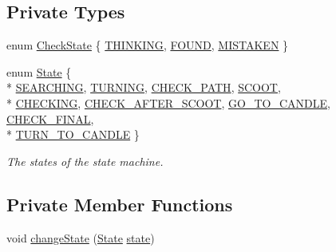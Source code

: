 \subsection*{Private Types}
\begin{DoxyCompactItemize}
\item 
enum \hyperlink{classSearcher_a2c16b7eb56e090a7b832da7f2c9d5e9c}{Check\-State} \{ \hyperlink{classSearcher_a2c16b7eb56e090a7b832da7f2c9d5e9ca3ab7d02ec8c70edce3b79cef009feaae}{T\-H\-I\-N\-K\-I\-N\-G}, 
\hyperlink{classSearcher_a2c16b7eb56e090a7b832da7f2c9d5e9ca464345238bfd562b33e293b4ce8a5f06}{F\-O\-U\-N\-D}, 
\hyperlink{classSearcher_a2c16b7eb56e090a7b832da7f2c9d5e9ca2e776f179e07bdd02764f1b78aeda8b9}{M\-I\-S\-T\-A\-K\-E\-N}
 \}
\item 
enum \hyperlink{classSearcher_ae8599d557b97324ac716e105dc044c57}{State} \{ \\*
\hyperlink{classSearcher_ae8599d557b97324ac716e105dc044c57a2ae2adf7296bc018ccfa3e4cb7f017db}{S\-E\-A\-R\-C\-H\-I\-N\-G}, 
\hyperlink{classSearcher_ae8599d557b97324ac716e105dc044c57af464509a3d677b55121f97c25d823202}{T\-U\-R\-N\-I\-N\-G}, 
\hyperlink{classSearcher_ae8599d557b97324ac716e105dc044c57a2182c983b5957f0a3fdc4251654acbe5}{C\-H\-E\-C\-K\-\_\-\-P\-A\-T\-H}, 
\hyperlink{classSearcher_ae8599d557b97324ac716e105dc044c57a1a45d3084f55b040010a5fc9fc5ee0bf}{S\-C\-O\-O\-T}, 
\\*
\hyperlink{classSearcher_ae8599d557b97324ac716e105dc044c57a79cee82e851194da5965420a078ec4ff}{C\-H\-E\-C\-K\-I\-N\-G}, 
\hyperlink{classSearcher_ae8599d557b97324ac716e105dc044c57aa966ccae58e54ef312b8a63e81135543}{C\-H\-E\-C\-K\-\_\-\-A\-F\-T\-E\-R\-\_\-\-S\-C\-O\-O\-T}, 
\hyperlink{classSearcher_ae8599d557b97324ac716e105dc044c57a7343adc6b3d00f640fc450a98d10a6d6}{G\-O\-\_\-\-T\-O\-\_\-\-C\-A\-N\-D\-L\-E}, 
\hyperlink{classSearcher_ae8599d557b97324ac716e105dc044c57a71a9cfaae80d57de38b7b7009387202b}{C\-H\-E\-C\-K\-\_\-\-F\-I\-N\-A\-L}, 
\\*
\hyperlink{classSearcher_ae8599d557b97324ac716e105dc044c57a9acc62c7adaafa496e626fffad278a2f}{T\-U\-R\-N\-\_\-\-T\-O\-\_\-\-C\-A\-N\-D\-L\-E}
 \}
\begin{DoxyCompactList}\small\item\em The states of the state machine. \end{DoxyCompactList}\end{DoxyCompactItemize}
\subsection*{Private Member Functions}
\begin{DoxyCompactItemize}
\item 
void \hyperlink{classSearcher_a96bbc956347affc50d2365018535aa52}{change\-State} (\hyperlink{classSearcher_ae8599d557b97324ac716e105dc044c57}{State} \hyperlink{classSearcher_aadc83ce2d77610d6572f98ecd8b4d6e4}{state})
\end{DoxyCompactItemize}
